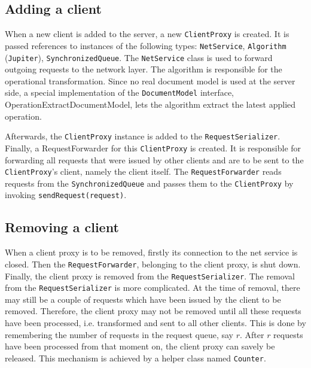 \subsection{Adding a client}
When a new client is added to the server, a new \texttt{ClientProxy} is created. It is passed references to instances of the following types: \texttt{NetService}, \texttt{Algorithm} (\texttt{Jupiter}), \texttt{SynchronizedQueue}. The \texttt{NetService} class is used to forward outgoing requests to the network layer. The algorithm is responsible for the operational transformation. Since no real document model is used at the server side, a special implementation of the \texttt{DocumentModel} interface, OperationExtractDocumentModel, lets the algorithm extract the latest applied operation.

Afterwards, the \texttt{ClientProxy} instance is added to the \texttt{RequestSerializer}. Finally, a RequestForwarder for this \texttt{ClientProxy} is created. It is responsible for forwarding all requests that were issued by other clients and are to be sent to the \texttt{ClientProxy}'s client, namely the client itself. The \texttt{RequestForwarder} reads requests from the \texttt{SynchronizedQueue} and passes them to the \texttt{ClientProxy} by invoking \texttt{sendRequest(request)}.

\subsection{Removing a client}
When a client proxy is to be removed, firstly its connection to the net service is closed. Then the \texttt{RequestForwarder}, belonging to the client proxy, is shut down. Finally, the client proxy is removed from the \texttt{RequestSerializer}. The removal from the \texttt{RequestSerializer} is more complicated. At the time of removal, there may still be a couple of requests which have been issued by the client to be removed. Therefore, the client proxy may not be removed until all these requests have been processed, i.e. transformed and sent to all other clients. This is done by remembering the number of requests in the request queue, say $r$. After $r$ requests have been processed from that moment on, the client proxy can savely be released. This mechanism is achieved by a helper class named \texttt{Counter}.

